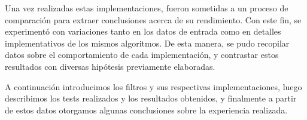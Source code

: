 Una vez realizadas estas implementaciones, fueron sometidas a un proceso de comparación para extraer conclusiones acerca de su rendimiento. Con este fin, se experimentó con variaciones tanto en los datos de entrada como en detalles implementativos de los mismos algoritmos. De esta manera, se pudo recopilar datos sobre el comportamiento de cada implementación, y contrastar estos resultados con diversas hipótesis previamente elaboradas.

A continuación introducimos los filtros y sus respectivas implementaciones, luego describimos los tests realizados y los resultados obtenidos, y finalmente a partir de estos datos otorgamos algunas conclusiones sobre la experiencia realizada.
